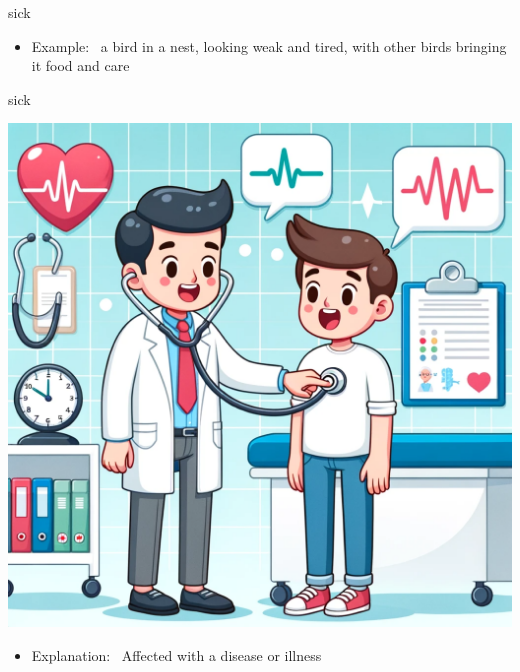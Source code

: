 \documentclass[avery5371, grid,frame]{flashcards}
\begin{document}
\begin{flashcard}{sick}
\begin{center}
\begin{minipage}[c]{.45\textwidth}
\begin{itemize}
            \item Example: \ a bird in a nest, looking weak and tired, with other birds bringing it food and care
            \end{itemize}
        \end{minipage}
    \end{center}
    \vspace*{\fill}
\end{flashcard}\begin{flashcard}{sick}
    \vspace*{\fill}
    \begin{center}
        \begin{minipage}[c]{.45\textwidth}
            \includegraphics[width=\textwidth]{cards/s/sick/sick - a doctor checking the heartbeat of a patient using a stethoscope, with medical charts and equipment in the background.png}
        \end{minipage}
        \begin{minipage}[c]{.45\textwidth}
            \begin{itemize}\setlength\itemsep{12pt}
            \item Explanation: \ Affected with a disease or illness


\end{itemize}
\end{minipage}
\end{center}
\end{flashcard}
\end{document}
